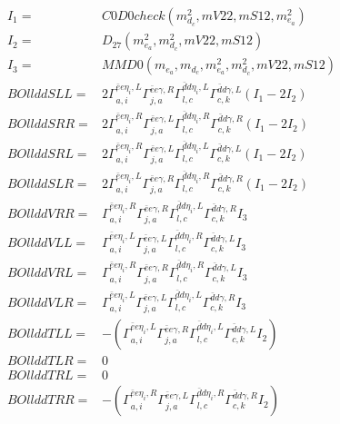 \documentclass[A4,landscape]{article}
\begin{document}
\begin{align} 
I_1 = & C0D0check(m^2_{d_{{c}}}, mV22, mS12, m^2_{e_{{a}}}) \\ 
I_2 = & D_{27}(m^2_{e_{{a}}}, m^2_{d_{{c}}}, mV22, mS12) \\ 
I_3 = & MMD0(m_{e_{{a}}}, m_{d_{{c}}}, m^2_{e_{{a}}}, m^2_{d_{{c}}}, mV22, mS12) \\ 
  BOllddSLL= & 2  \Gamma^{\bar{e}e \eta_i ,L}_{a, i} \Gamma^{\bar{e}e \gamma ,R}_{j, a} \Gamma^{\bar{d}d \eta_i ,L}_{l, c} \Gamma^{\bar{d}d \gamma ,L}_{c, k} (I_1 - 2 I_2) \\ 
  BOllddSRR= & 2  \Gamma^{\bar{e}e \eta_i ,R}_{a, i} \Gamma^{\bar{e}e \gamma ,L}_{j, a} \Gamma^{\bar{d}d \eta_i ,R}_{l, c} \Gamma^{\bar{d}d \gamma ,R}_{c, k} (I_1 - 2 I_2) \\ 
  BOllddSRL= & 2  \Gamma^{\bar{e}e \eta_i ,R}_{a, i} \Gamma^{\bar{e}e \gamma ,L}_{j, a} \Gamma^{\bar{d}d \eta_i ,L}_{l, c} \Gamma^{\bar{d}d \gamma ,L}_{c, k} (I_1 - 2 I_2) \\ 
  BOllddSLR= & 2  \Gamma^{\bar{e}e \eta_i ,L}_{a, i} \Gamma^{\bar{e}e \gamma ,R}_{j, a} \Gamma^{\bar{d}d \eta_i ,R}_{l, c} \Gamma^{\bar{d}d \gamma ,R}_{c, k} (I_1 - 2 I_2) \\ 
  BOllddVRR= &  \Gamma^{\bar{e}e \eta_i ,R}_{a, i} \Gamma^{\bar{e}e \gamma ,R}_{j, a} \Gamma^{\bar{d}d \eta_i ,L}_{l, c} \Gamma^{\bar{d}d \gamma ,R}_{c, k} I_3 \\ 
  BOllddVLL= &  \Gamma^{\bar{e}e \eta_i ,L}_{a, i} \Gamma^{\bar{e}e \gamma ,L}_{j, a} \Gamma^{\bar{d}d \eta_i ,R}_{l, c} \Gamma^{\bar{d}d \gamma ,L}_{c, k} I_3 \\ 
  BOllddVRL= &  \Gamma^{\bar{e}e \eta_i ,R}_{a, i} \Gamma^{\bar{e}e \gamma ,R}_{j, a} \Gamma^{\bar{d}d \eta_i ,R}_{l, c} \Gamma^{\bar{d}d \gamma ,L}_{c, k} I_3 \\ 
  BOllddVLR= &  \Gamma^{\bar{e}e \eta_i ,L}_{a, i} \Gamma^{\bar{e}e \gamma ,L}_{j, a} \Gamma^{\bar{d}d \eta_i ,L}_{l, c} \Gamma^{\bar{d}d \gamma ,R}_{c, k} I_3 \\ 
  BOllddTLL= & -( \Gamma^{\bar{e}e \eta_i ,L}_{a, i} \Gamma^{\bar{e}e \gamma ,R}_{j, a} \Gamma^{\bar{d}d \eta_i ,L}_{l, c} \Gamma^{\bar{d}d \gamma ,L}_{c, k} I_2) \\ 
  BOllddTLR= & 0 \\ 
  BOllddTRL= & 0 \\ 
  BOllddTRR= & -( \Gamma^{\bar{e}e \eta_i ,R}_{a, i} \Gamma^{\bar{e}e \gamma ,L}_{j, a} \Gamma^{\bar{d}d \eta_i ,R}_{l, c} \Gamma^{\bar{d}d \gamma ,R}_{c, k} I_2) \\ 
\end{align} 
\end{document}
